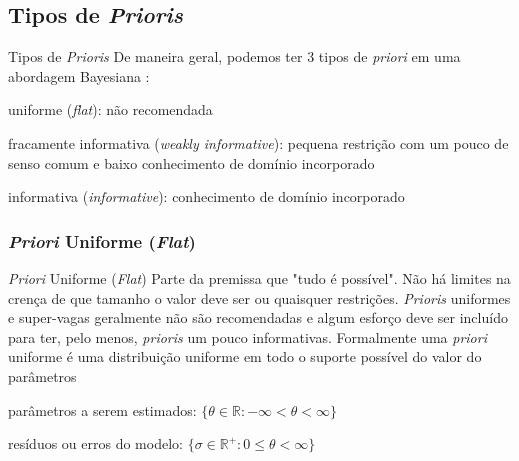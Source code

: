 \subsection{Tipos de \textit{Prioris}}

\begin{frame}{Tipos de \textit{Prioris}}
	De maneira geral, podemos ter 3 tipos de \textit{priori} em uma abordagem
	Bayesiana \parencite{gelman2013bayesian, mcelreath2020statistical, vandeschootBayesianStatisticsModelling2021}:
	\begin{vfilleditems}
		\item uniforme (\textit{flat}): não recomendada
		\item fracamente informativa (\textit{weakly informative}): pequena restrição
		com um pouco de senso comum e baixo conhecimento de domínio incorporado
		\item informativa (\textit{informative}): conhecimento de domínio incorporado
	\end{vfilleditems}
\end{frame}

\subsubsection{\textit{Priori} Uniforme (\textit{Flat})}
\begin{frame}{\textit{Priori} Uniforme (\textit{Flat})}
	Parte da premissa que "tudo é possível". Não há limites na crença de que tamanho
	o valor deve ser ou quaisquer restrições.
	\vfill
	\textit{Prioris} uniformes e super-vagas geralmente não são recomendadas e algum
	esforço deve ser incluído para ter, pelo menos, \textit{prioris} um pouco
	informativas.
	\vfill
	Formalmente uma \textit{priori} uniforme é uma distribuição uniforme em todo o
	suporte possível do valor do parâmetros
	\begin{vfilleditems}
		\item parâmetros a serem estimados: $\{\theta \in \mathbb{R} : -\infty < \theta < \infty\}$
		\item resíduos ou erros do modelo: $\{\sigma \in \mathbb{R}^+ : 0 \leq \theta < \infty\}$
	\end{vfilleditems}
\end{frame}

